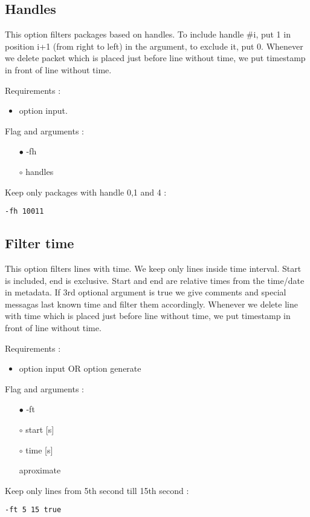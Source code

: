 \documentclass[english]{article}
\begin{document}
\subsection{Handles}
This option filters packages based on handles. To include handle \#i, put 1 in position i+1 (from right to left) in the argument, to exclude it, put 0. Whenever we delete packet which is placed just before line without time, we put timestamp in front of line without time.

\noindent Requirements : 
\begin{itemize}
\item option input. 
\end{itemize}
Flag and arguments :
\begin{itemize}
\item[$\bullet$] -fh
\item[$\circ$] handles
\end{itemize}
Keep only packages with handle 0,1 and 4 : 
\begin{lstlisting} 
-fh 10011
\end{lstlisting}


\subsection{Filter time}
This option filters lines with time. We keep only lines inside time interval. Start is included, end is exclusive. Start and end are relative times from the time/date in metadata. If 3rd optional argument is true we give comments and special messagas last known time and filter them accordingly.  Whenever we delete line with time which is placed just before line without time, we put timestamp in front of line without time.

\noindent Requirements : 
\begin{itemize}
\item option input OR option generate
\end{itemize}
Flag and arguments :
\begin{itemize}
\item[$\bullet$] -ft
\item[$\circ$] start [s]
\item[$\circ$] time [s]
\item[\textasteriskcentered] aproximate
\end{itemize}
Keep only lines from 5th second till 15th second : 
\begin{lstlisting} 
-ft 5 15 true
\end{lstlisting}
\end{document}

